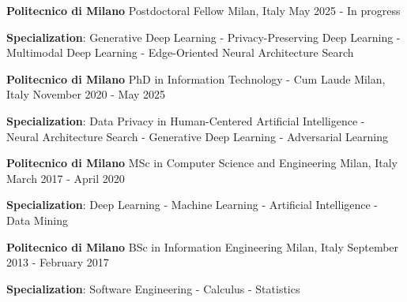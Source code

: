 \begin{cventries}
  \cventry
    {\textbf{Politecnico di Milano}} %
    {Postdoctoral Fellow} %
    {Milan, Italy} %
    {May 2025 - In progress} %
    {
      \begin{cvitems} %
         \item{\textbf{Specialization}: Generative Deep Learning - Privacy-Preserving Deep Learning - \\ Multimodal Deep Learning - Edge-Oriented Neural Architecture Search}
      \end{cvitems}
    }
    \vspace{2mm}
  \cventry
    {\textbf{Politecnico di Milano}} %
    {PhD in Information Technology - Cum Laude} %
    {Milan, Italy} %
    {November 2020 - May 2025} %
    {
      \begin{cvitems} %
         \item{\textbf{Specialization}: Data Privacy in Human-Centered Artificial Intelligence - \\ Neural Architecture Search - Generative Deep Learning - Adversarial Learning}
      \end{cvitems}
    }
    \vspace{2mm}
  \cventry
    {\textbf{Politecnico di Milano}} %
    {MSc in Computer Science and Engineering} %
    {Milan, Italy} %
    {March 2017 - April 2020} %
    {
      \begin{cvitems} %
         \item{\textbf{Specialization}: Deep Learning - Machine Learning - Artificial Intelligence - Data Mining}
      \end{cvitems}
    }
    \vspace{2mm}
  \cventry
    {\textbf{Politecnico di Milano}} %
    {BSc in Information Engineering} %
    {Milan, Italy} %
    {September 2013 - February 2017} %
    {
      \begin{cvitems} %
         \vspace{0.5mm}
         \item{\textbf{Specialization}: Software Engineering - Calculus - Statistics}
      \end{cvitems}
    }
\end{cventries}

